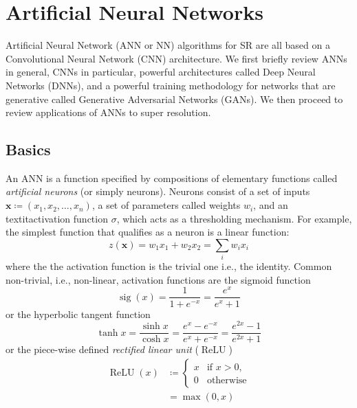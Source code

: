 \section{Artificial Neural Networks}\label{sec:neural-networks}
\localtableofcontents
Artificial Neural Network (ANN or NN) algorithms for SR are all based on a Convolutional Neural Network (CNN) architecture.
%
We first briefly review ANNs in general, CNNs in particular, powerful architectures called Deep Neural Networks (DNNs), and a powerful training methodology for networks that are generative called Generative Adversarial Networks (GANs).
%
We then proceed to review applications of ANNs to super resolution.
%
\subsection{Basics}

An ANN is a function specified by compositions of elementary functions called \textit{artificial neurons} (or simply neurons).
%
Neurons consist of a set of inputs \(\mathbf{x} \coloneqq (x_1, x_2, \dots, x_n)\), a set of parameters called weights \(w_i\), and an textit{activation function} \(\sigma\), which acts as a thresholding mechanism.
%
For example, the simplest function that qualifies as a neuron is a linear function:
\begin{equation}
    z(\mathbf{x}) = w_1 x_1 + w_2 x_2 = \sum_i w_i x_i
    \label{eqn:simpleann}
\end{equation}
where the the activation function is the trivial one i.e., the identity.
%
Common non-trivial, i.e., non-linear, activation functions are the sigmoid function
\begin{equation}
    \operatorname{sig}(x)={\frac {1}{1+e^{-x}}}={\frac {e^{x}}{e^{x}+1}}
\end{equation}
or the hyperbolic tangent function
\begin{equation}
    \tanh x={\frac {\sinh x}{\cosh x}}={\frac {e^{x}-e^{-x}}{e^{x}+e^{-x}}}={\frac {e^{2x}-1}{e^{2x}+1}}
\end{equation}
or the piece-wise defined \textit{rectified linear unit} (\(\operatorname{ReLU}\))
\begin{align}
    \operatorname{ReLU}(x) & \coloneqq \begin{cases}x&{\text{if }}x>0,\\0&{\text{otherwise}}\end{cases} \\
                           & = \max(0, x)
\end{align}
